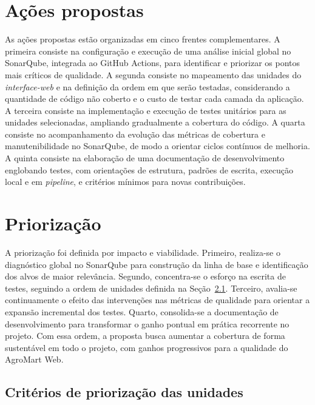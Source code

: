 

\section{Ações propostas}

As ações propostas estão organizadas em cinco frentes complementares.
A primeira consiste na configuração e execução de uma análise inicial global no SonarQube, integrada ao GitHub Actions, para identificar e priorizar os pontos mais críticos de qualidade.
A segunda consiste no mapeamento das unidades do \textit{interface-web} e na definição da ordem em que serão testadas, considerando a quantidade de código não coberto e o custo de testar cada camada da aplicação.
A terceira consiste na implementação e execução de testes unitários para as unidades selecionadas, ampliando gradualmente a cobertura do código.
A quarta consiste no acompanhamento da evolução das métricas de cobertura e manutenibilidade no SonarQube, de modo a orientar ciclos contínuos de melhoria.
A quinta consiste na elaboração de uma documentação de desenvolvimento englobando testes, com orientações de estrutura, padrões de escrita, execução local e em \textit{pipeline}, e critérios mínimos para novas contribuições.


\section{Priorização}

A priorização foi definida por impacto e viabilidade.
Primeiro, realiza-se o diagnóstico global no SonarQube para construção da linha de base e identificação dos alvos de maior relevância.
Segundo, concentra-se o esforço na escrita de testes, seguindo a ordem de unidades definida na Seção~\ref{sec:criterios-priorizacao}.
Terceiro, avalia-se continuamente o efeito das intervenções nas métricas de qualidade para orientar a expansão incremental dos testes.
Quarto, consolida-se a documentação de desenvolvimento para transformar o ganho pontual em prática recorrente no projeto.
Com essa ordem, a proposta busca aumentar a cobertura de forma sustentável em todo o projeto, com ganhos progressivos para a qualidade do AgroMart Web.

\subsection{Critérios de priorização das unidades}
\label{sec:criterios-priorizacao}


